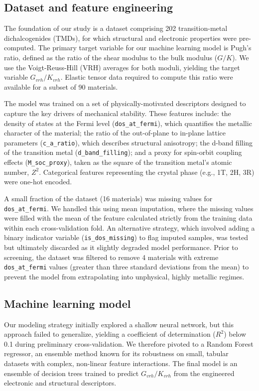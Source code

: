 \documentclass[]{article}
\begin{document}
\subsection{Dataset and feature engineering}
The foundation of our study is a dataset comprising 202 transition-metal dichalcogenides (TMDs), for which structural and electronic properties were pre-computed. The primary target variable for our machine learning model is Pugh's ratio, defined as the ratio of the shear modulus to the bulk modulus ($G/K$). We use the Voigt-Reuss-Hill (VRH) averages for both moduli, yielding the target variable $G_{vrh}/K_{vrh}$. Elastic tensor data required to compute this ratio were available for a subset of 90 materials.

The model was trained on a set of physically-motivated descriptors designed to capture the key drivers of mechanical stability. These features include: the density of states at the Fermi level (\texttt{dos\_at\_fermi}), which quantifies the metallic character of the material; the ratio of the out-of-plane to in-plane lattice parameters (\texttt{c\_a\_ratio}), which describes structural anisotropy; the d-band filling of the transition metal (\texttt{d\_band\_filling}); and a proxy for spin-orbit coupling effects (\texttt{M\_soc\_proxy}), taken as the square of the transition metal's atomic number, $Z^2$. Categorical features representing the crystal phase (e.g., 1T, 2H, 3R) were one-hot encoded.

A small fraction of the dataset (16 materials) was missing values for \texttt{dos\_at\_fermi}. We handled this using mean imputation, where the missing values were filled with the mean of the feature calculated strictly from the training data within each cross-validation fold. An alternative strategy, which involved adding a binary indicator variable (\texttt{is\_dos\_missing}) to flag imputed samples, was tested but ultimately discarded as it slightly degraded model performance. Prior to screening, the dataset was filtered to remove 4 materials with extreme \texttt{dos\_at\_fermi} values (greater than three standard deviations from the mean) to prevent the model from extrapolating into unphysical, highly metallic regimes.

\subsection{Machine learning model}
Our modeling strategy initially explored a shallow neural network, but this approach failed to generalize, yielding a coefficient of determination ($R^2$) below 0.1 during preliminary cross-validation. We therefore pivoted to a Random Forest regressor, an ensemble method known for its robustness on small, tabular datasets with complex, non-linear feature interactions. The final model is an ensemble of decision trees trained to predict $G_{vrh}/K_{vrh}$ from the engineered electronic and structural descriptors.
\end{document}
